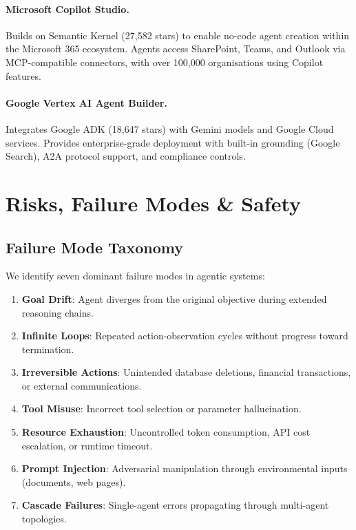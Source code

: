 \documentclass[12pt, a4paper]{article}
\begin{document}
\paragraph{Microsoft Copilot Studio.} Builds on Semantic Kernel (27,582 stars) to enable no-code agent creation within the Microsoft 365 ecosystem. Agents access SharePoint, Teams, and Outlook via MCP-compatible connectors, with over 100,000 organisations using Copilot features.

\paragraph{Google Vertex AI Agent Builder.} Integrates Google ADK (18,647 stars) with Gemini models and Google Cloud services. Provides enterprise-grade deployment with built-in grounding (Google Search), A2A protocol support, and compliance controls.

\section{Risks, Failure Modes \& Safety}\label{sec:risks}

\subsection{Failure Mode Taxonomy}
We identify seven dominant failure modes in agentic systems:
\begin{enumerate}
    \item \textbf{Goal Drift}: Agent diverges from the original objective during extended reasoning chains.
    \item \textbf{Infinite Loops}: Repeated action-observation cycles without progress toward termination.
    \item \textbf{Irreversible Actions}: Unintended database deletions, financial transactions, or external communications.
    \item \textbf{Tool Misuse}: Incorrect tool selection or parameter hallucination.
    \item \textbf{Resource Exhaustion}: Uncontrolled token consumption, API cost escalation, or runtime timeout.
    \item \textbf{Prompt Injection}: Adversarial manipulation through environmental inputs (documents, web pages).
    \item \textbf{Cascade Failures}: Single-agent errors propagating through multi-agent topologies.
\end{enumerate}
\end{document}
